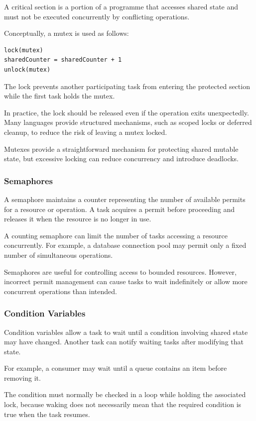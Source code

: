 A critical section is a portion of a programme that accesses shared state and must not be executed concurrently by conflicting operations.

Conceptually, a mutex is used as follows:

\begin{lstlisting}
lock(mutex)
sharedCounter = sharedCounter + 1
unlock(mutex)
\end{lstlisting}

The lock prevents another participating task from entering the protected section while the first task holds the mutex.

In practice, the lock should be released even if the operation exits unexpectedly. Many languages provide structured mechanisms, such as scoped locks or deferred cleanup, to reduce the risk of leaving a mutex locked.

Mutexes provide a straightforward mechanism for protecting shared mutable state, but excessive locking can reduce concurrency and introduce deadlocks.

\subsubsection{Semaphores}

A semaphore maintains a counter representing the number of available permits for a resource or operation. A task acquires a permit before proceeding and releases it when the resource is no longer in use.

A counting semaphore can limit the number of tasks accessing a resource concurrently. For example, a database connection pool may permit only a fixed number of simultaneous operations.

Semaphores are useful for controlling access to bounded resources. However, incorrect permit management can cause tasks to wait indefinitely or allow more concurrent operations than intended.

\subsubsection{Condition Variables}

Condition variables allow a task to wait until a condition involving shared state may have changed. Another task can notify waiting tasks after modifying that state.

For example, a consumer may wait until a queue contains an item before removing it.

The condition must normally be checked in a loop while holding the associated lock, because waking does not necessarily mean that the required condition is true when the task resumes.

